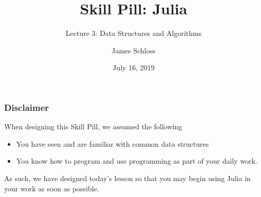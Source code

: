\documentclass{beamer}
\title[Skill Pill]{Skill Pill: Julia} %
\subtitle{Lecture 3: Data Structures and Algorithms}
\author{James Schloss} %
\institute[OIST] %
{
Okinawa Institute of Science and Technology \\ %
}
\date{July 16, 2019} %
\begin{document}

\begin{frame}
\vspace*{1.4cm}
\titlepage %
\end{frame}



\begin{frame}
  \tableofcontents
\end{frame}

\begin{frame}
\frametitle{Disclaimer}

When designing this Skill Pill, we assumed the following
\begin{itemize}
\item You have seen and are familiar with common data structures
\item You know how to program and use programming as part of your daily work. 
\end{itemize}

As such, we have designed today's lesson so that you may begin using Julia in your work as soon as possible.

\end{frame}
\end{document}
